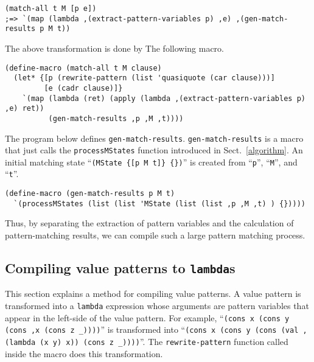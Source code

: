 \documentclass[acmlarge]{acmart}
\begin{document}
\begin{lstlisting}[language=egison]
(match-all t M [p e])
;=> `(map (lambda ,(extract-pattern-variables p) ,e) ,(gen-match-results p M t))
\end{lstlisting}

\noindent The above transformation is done by The following macro.

\begin{lstlisting}[language=egison]
(define-macro (match-all t M clause)
  (let* {[p (rewrite-pattern (list 'quasiquote (car clause)))]
         [e (cadr clause)]}
    `(map (lambda (ret) (apply (lambda ,(extract-pattern-variables p) ,e) ret))
          (gen-match-results ,p ,M ,t))))
\end{lstlisting}

\noindent The program below defines \texttt{gen-match-results}.
\texttt{gen-match-results} is a macro that just calls the \texttt{processMStates} function introduced in Sect.~\ref{algorithm}.
An initial matching state ``\verb|(MState {[p M t]} {})|'' is created from ``\texttt{p}'', ``\texttt{M}'', and ``\texttt{t}''.

\begin{lstlisting}[language=egison]
(define-macro (gen-match-results p M t)
  `(processMStates (list (list 'MState (list (list ,p ,M ,t) ) {}))))
\end{lstlisting}

\medskip

Thus, by separating the extraction of pattern variables and the calculation of pattern-matching results, we can compile such a large pattern matching process.


\subsection{Compiling value patterns to \texttt{lambda}s}\label{method-val-pat}

This section explains a method for compiling value patterns.
A value pattern is transformed into a \texttt{lambda} expression whose arguments are pattern variables that appear in the left-side of the value pattern.
For example, ``\texttt{(cons x (cons y (cons ,x (cons z _))))}'' is transformed into ``\texttt{(cons x (cons y (cons (val ,(lambda (x y) x)) (cons z _))))}''.
The \texttt{rewrite-pattern} function called inside the macro does this transformation.
\end{document}
